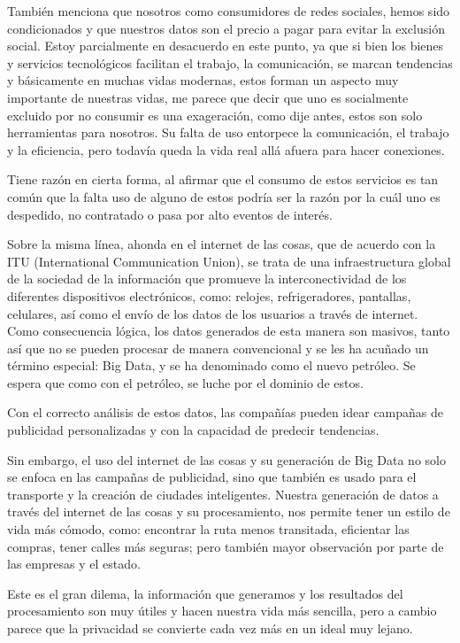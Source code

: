 \documentclass[12pt]{report}
\begin{document}
\begin{enumerate}[label=\textbf{\arabic*.}, leftmargin=*]
También menciona que nosotros como consumidores de redes sociales, hemos sido condicionados y que nuestros datos son el precio a pagar para evitar la exclusión social. Estoy parcialmente en desacuerdo en este punto, ya que si bien los bienes y servicios tecnológicos facilitan el trabajo, la comunicación, se marcan tendencias y básicamente en muchas vidas modernas, estos forman un aspecto muy importante de nuestras vidas, me parece que decir que uno es socialmente excluido por no consumir  es una exageración, como dije antes, estos son solo herramientas para nosotros. Su falta de uso entorpece la comunicación, el trabajo y la eficiencia, pero todavía queda la vida real allá afuera para hacer conexiones.

Tiene razón en cierta forma, al afirmar que el consumo de estos servicios es tan común que la falta uso de alguno de estos podría ser la razón por la cuál uno es despedido, no contratado o pasa por alto eventos de interés.

Sobre la misma línea, ahonda en el internet de las cosas, que de acuerdo con la ITU (International Communication Union), se trata de una infraestructura global de la sociedad de la información que promueve la interconectividad de los diferentes dispositivos electrónicos, como: relojes, refrigeradores, pantallas, celulares, así como el envío de los datos de los usuarios a través de internet. Como consecuencia lógica, los datos generados de esta manera son masivos, tanto así que no se pueden procesar de manera convencional y se les ha acuñado un término especial: Big Data, y se ha denominado como el nuevo petróleo. Se espera que como con el petróleo, se luche por el dominio de estos.

Con el correcto análisis de estos datos, las compañías pueden idear campañas de publicidad personalizadas y con la capacidad de predecir tendencias.

Sin embargo, el uso del internet de las cosas y su generación de Big Data no solo se enfoca en las campañas de publicidad, sino que también es usado para el transporte y  la creación de ciudades inteligentes. Nuestra generación de datos a través del internet de las cosas y su procesamiento, nos permite tener un estilo de vida más cómodo, como: encontrar la ruta menos transitada, eficientar las compras, tener calles más seguras; pero también mayor observación por parte de las empresas y el estado.

Este es el gran dilema, la información que generamos y los resultados del procesamiento son muy útiles y hacen nuestra vida más sencilla, pero a cambio parece que la privacidad se convierte cada vez más en un ideal muy lejano.


\end{enumerate}
\end{document}
